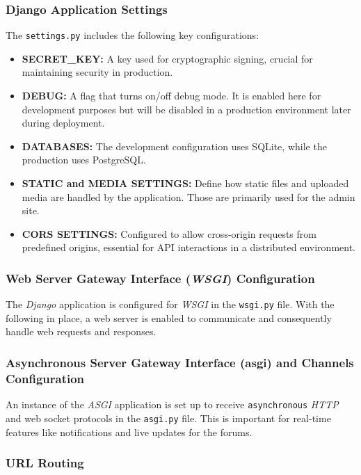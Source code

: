 \subsubsection{Django Application Settings}

The \texttt{settings.py} includes the following key configurations:
\begin{itemize}
    \item \textbf{SECRET\_KEY:} A key used for cryptographic signing, crucial for maintaining security in production.
    \item \textbf{DEBUG:} A flag that turns on/off debug mode. It is enabled here for development purposes but will be disabled in a production environment later during deployment.
    \item \textbf{DATABASES:} The development configuration uses SQLite, while the production uses PostgreSQL.
    \item \textbf{STATIC and MEDIA SETTINGS:} Define how static files and uploaded media are handled by the application. Those are primarily used for the admin site. 
    \item \textbf{CORS SETTINGS:} Configured to allow cross-origin requests from predefined origins, essential for API interactions in a distributed environment.
\end{itemize}

\subsubsection{Web Server Gateway Interface (\textit{WSGI}) Configuration}

The \textit{Django} application is configured for \textit{WSGI} in the \texttt{wsgi.py} file. With the following in place, a web server is enabled to communicate and consequently handle web requests and responses.

\subsubsection{Asynchronous Server Gateway Interface (asgi) and Channels Configuration}

An instance of the \textit{ASGI} application is set up to receive \texttt{asynchronous} \textit{HTTP} and web socket protocols in the \texttt{asgi.py} file. This is important for real-time features like notifications and live updates for the forums.

\subsubsection{URL Routing}


